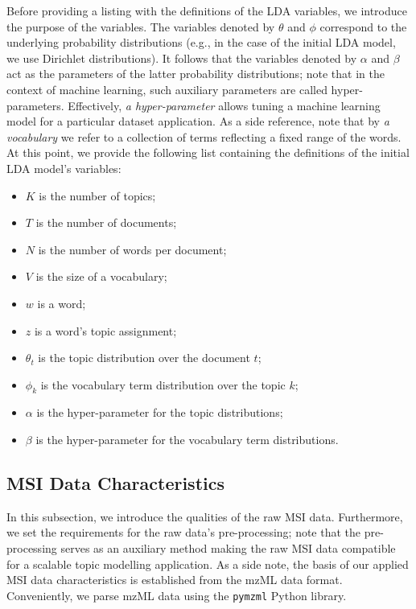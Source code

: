\documentclass{mpaper}
\begin{document}
\par Before providing a listing with the definitions of the LDA variables, we introduce the purpose of the variables. The variables denoted by $\theta$ and $\phi$ correspond to the underlying probability distributions (e.g., in the case of the initial LDA model, we use Dirichlet distributions). It follows that the variables denoted by $\alpha$ and $\beta$ act as the parameters of the latter probability distributions; note that in the context of machine learning, such auxiliary parameters are called hyper-parameters. Effectively, \textit{a hyper-parameter} allows tuning a machine learning model for a particular dataset application. As a side reference, note that by \textit{a vocabulary} we refer to a collection of terms reflecting a fixed range of the words. At this point, we provide the following list containing the definitions of the initial LDA model's variables: 
\begin{itemize}
	\item $K$ is the number of topics;
	\item $T$ is the number of documents;
	\item $N$ is the number of words per document;
	\item $V$ is the size of a vocabulary;
	\item $w$ is a word;
	\item $z$ is a word's topic assignment;
	\item $\theta_t$ is the topic distribution over the document $t$;
	\item $\phi_k$ is the vocabulary term distribution over the topic $k$;
	\item $\alpha$ is the hyper-parameter for the topic distributions;
	\item $\beta$ is the hyper-parameter for the vocabulary term distributions.
\end{itemize}

\subsection{MSI Data Characteristics}

\par In this subsection, we introduce the qualities of the raw MSI data. Furthermore, we set the requirements for the raw data's pre-processing; note that the pre-processing serves as an auxiliary method making the raw MSI data compatible for a scalable topic modelling application. As a side note, the basis of our applied MSI data characteristics is established from the mzML data format. Conveniently, we parse mzML data using the \texttt{pymzml} Python library. 
\end{document}
